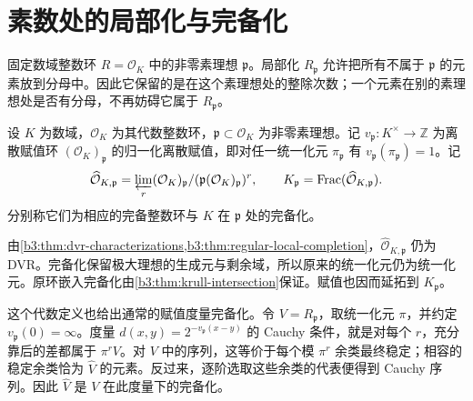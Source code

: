 
\section{素数处的局部化与完备化}
\label{b3:sec:A03}

%
%
%


固定数域整数环 \(R=\mathcal O_K\) 中的非零素理想 \(\mathfrak p\)。局部化 \(R_{\mathfrak p}\) 允许把所有不属于 \(\mathfrak p\) 的元素放到分母中。因此它保留的是在这个素理想处的整除次数；一个元素在别的素理想处是否有分母，不再妨碍它属于 \(R_{\mathfrak p}\)。

\begin{definition}\label{b3:def:number-field-prime-completion}
	设 \(K\) 为数域，\(\mathcal O_K\) 为其代数整数环，\(\mathfrak p\subset\mathcal O_K\) 为非零素理想。记 \(v_{\mathfrak p}:K^\times\to\mathbb Z\) 为离散赋值环 \((\mathcal O_K)_{\mathfrak p}\) 的归一化离散赋值，即对任一统一化元 \(\pi_{\mathfrak p}\) 有 \(v_{\mathfrak p}(\pi_{\mathfrak p})=1\)。记
	\[
		\widehat{\mathcal O}_{K,\mathfrak p} =\varprojlim_r(\mathcal O_K)_{\mathfrak p}/ (\mathfrak p(\mathcal O_K)_{\mathfrak p})^r, \qquad K_{\mathfrak p}=\operatorname{Frac}(\widehat{\mathcal O}_{K,\mathfrak p}).
	\]
	分别称它们为相应的完备整数环与 \(K\) 在 \(\mathfrak p\) 处的完备化。
\end{definition}

由\cref{b3:thm:dvr-characterizations,b3:thm:regular-local-completion}，\(\widehat{\mathcal O}_{K,\mathfrak p}\) 仍为 DVR。完备化保留极大理想的生成元与剩余域，所以原来的统一化元仍为统一化元。原环嵌入完备化由\cref{b3:thm:krull-intersection}保证。赋值也因而延拓到 \(K_{\mathfrak p}\)。

这个代数定义也给出通常的赋值度量完备化。令 \(V=R_{\mathfrak p}\)，取统一化元 \(\pi\)，并约定 \(v_{\mathfrak p}(0)=\infty\)。度量 \(d(x,y)=2^{-v_{\mathfrak p}(x-y)}\) 的 Cauchy 条件，就是对每个 \(r\)，充分靠后的差都属于 \(\pi^rV\)。对 \(V\) 中的序列，这等价于每个模 \(\pi^r\) 余类最终稳定；相容的稳定余类恰为 \(\widehat V\) 的元素。反过来，逐阶选取这些余类的代表便得到 Cauchy 序列。因此 \(\widehat V\) 是 \(V\) 在此度量下的完备化。

